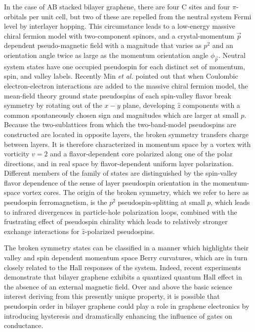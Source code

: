 \documentclass[twocolumn,prb,showpacs,preprintnumbers,amsmath,amssymb]{revtex4}
\begin{document}
In the case of AB stacked bilayer graphene, there are four C sites and four $\pi$-orbitals per
unit cell, but two of these are repelled from the neutral system Fermi level by interlayer hopping. 
This circumstance leads to a low-energy massive chiral fermion model\cite{falko} with two-component spinors, and a 
crystal-momentum $\vec{p}$ dependent pseudo-magnetic field with a magnitude that 
varies as $p^2$ and an orientation angle twice as large as the momentum orientation 
angle $\phi_{\vec{p}}$.  Neutral system states have one occupied pseudospin for
each distinct set of momentum, spin, and valley labels.  Recently\cite{pmag} Min {\em et al.} pointed out that when 
Coulombic electron-electron interactions are added to the massive chiral fermion model, 
the mean-field theory ground state pseudospins of each spin-valley flavor break symmetry by rotating out 
of the $x-y$ plane, developing $\hat{z}$ components with a common spontaneously chosen sign
and magnitudes which are larger at small $p$.
Because the two-sublattices from which the two-band-model pseudospins are constructed are located in 
opposite layers, the broken symmetry transfers charge between layers. 
It is therefore characterized in momentum space by a vortex with 
vorticity $v=2$ and a flavor-dependent core polarized along one of the polar directions, and in real space by
flavor-dependent  
uniform layer polarization.  Different members of the family of states are distinguished by the spin-valley flavor
dependence of the sense of layer pseudospin orientation in the momentum-space vortex cores. 
The origin of the broken symmetry,
which we refer to here as pseudospin ferromagnetism, \cite{pmag} 
is the $p^2$ pseudospin-splitting at small $p$, which leads to infrared divergences \cite{fanzhang}
in particle-hole polarization loops,
combined with the frustrating effect of pseudospin chirality which leads to relatively
stronger exchange interactions for $\hat{z}$-polarized pseudospins.  

The broken symmetry states can be classified\cite{nandkishore2, xiaofan} in a manner which highlights their valley
and spin dependent momentum space Berry curvatures, 
which are in turn closely related\cite{niureview,NagaosaReview} to the 
Hall responses of the system.
Indeed, recent experiments\cite{yacoby_latest} demonstrate that bilayer graphene  
exhibits a quantized quantum Hall effect in the absence of an external magnetic field.
Over and above the basic science interest deriving from this presently unique property, 
it is possible that pseudospin order in bilayer graphene could play a role in graphene electronics\cite{bilayerpseudospintronics} by 
introducing hysteresis and dramatically enhancing the influence of gates on conductance.  
\end{document}

